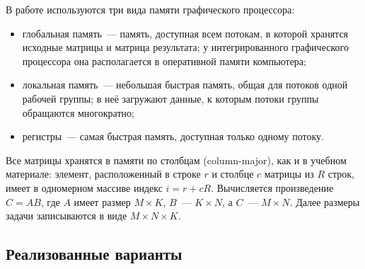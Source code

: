 \documentclass[a4paper]{article}
\begin{document}
В работе используются три вида памяти графического процессора:
\begin{itemize}
    \item глобальная память~--- память, доступная всем потокам, в
    которой хранятся исходные матрицы и матрица результата;
    у интегрированного графического процессора она располагается в
    оперативной памяти компьютера;
    \item локальная память~--- небольшая быстрая память, общая для
    потоков одной рабочей группы; в неё загружают данные, к которым
    потоки группы обращаются многократно;
    \item регистры~--- самая быстрая память, доступная только одному
    потоку.
\end{itemize}

Все матрицы хранятся в памяти по столбцам (column-major), как и в
учебном материале: элемент, расположенный в строке $r$ и столбце $c$
матрицы из $R$ строк, имеет в одномерном массиве индекс $i = r + cR$.
Вычисляется произведение $C = AB$, где $A$ имеет размер $M \times K$,
$B$~--- $K \times N$, а $C$~--- $M \times N$. Далее размеры задачи
записываются в виде $M \times N \times K$.

\subsection{Реализованные варианты}
\end{document}
